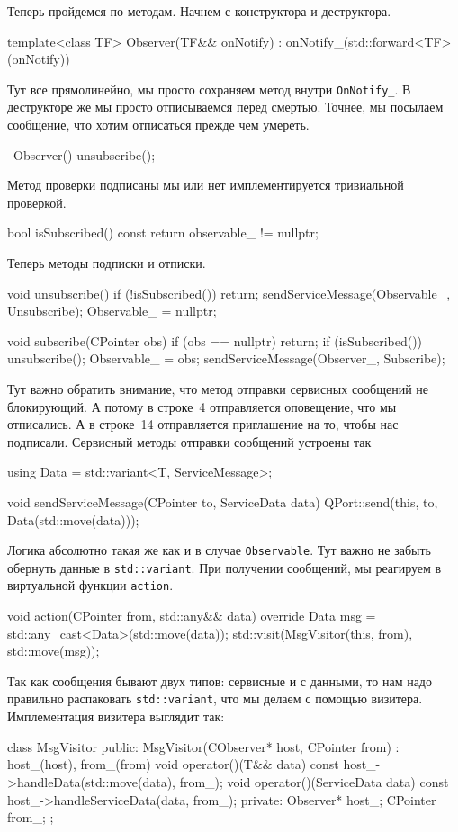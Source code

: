 Теперь пройдемся по методам.
Начнем с конструктора и деструктора.
\begin{cppcode}
template<class TF>
Observer(TF&& onNotify) : onNotify_(std::forward<TF>(onNotify)) {}
\end{cppcode}
Тут все прямолинейно, мы просто сохраняем метод внутри \verb"OnNotify_".
В деструкторе же мы просто отписываемся перед смертью.
Точнее, мы посылаем сообщение, что хотим отписаться прежде чем умереть.
\begin{cppcode}
~Observer() {
  unsubscribe();
}
\end{cppcode}
Метод проверки подписаны мы или нет имплементируется тривиальной проверкой.
\begin{cppcode}
bool isSubscribed() const {
  return observable_ != nullptr;
}
\end{cppcode}
Теперь методы подписки и отписки.
\begin{cppcode}
void unsubscribe() {
  if (!isSubscribed())
    return;
  sendServiceMessage(Observable_, {Unsubscribe});
  Observable_ = nullptr;
}

void subscribe(CPointer obs) {
  if (obs == nullptr)
    return;
  if (isSubscribed())
    unsubscribe();
  Observable_ = obs;
  sendServiceMessage(Observer_, {Subscribe});
}
\end{cppcode}
Тут важно обратить внимание, что метод отправки сервисных сообщений не блокирующий.
А потому в строке~4 отправляется оповещение, что мы отписались.
А в строке~14 отправляется приглашение на то, чтобы нас подписали.
Сервисный методы отправки сообщений устроены так
\begin{cppcode}
using Data = std::variant<T, ServiceMessage>;

void sendServiceMessage(CPointer to, ServiceData data) {
  QPort::send(this, to, Data(std::move(data)));
}
\end{cppcode}
Логика абсолютно такая же как и в случае \verb"Observable".
Тут важно не забыть обернуть данные в \verb"std::variant".
При получении сообщений, мы реагируем в виртуальной функции \verb"action".
\begin{cppcode}
void action(CPointer from, std::any&& data) override {
  Data msg = std::any_cast<Data>(std::move(data));
  std::visit(MsgVisitor(this, from), std::move(msg));
}
\end{cppcode}
Так как сообщения бывают двух типов: сервисные и с данными, то нам надо правильно распаковать \verb"std::variant", что мы делаем с помощью визитера.
Имплементация визитера выглядит так:
\begin{cppcode}
class MsgVisitor {
public:
  MsgVisitor(CObserver* host, CPointer from) : host_(host), from_(from) {
  }
  void operator()(T&& data) const {
    host_->handleData(std::move(data), from_);
  }
  void operator()(ServiceData data) const {
    host_->handleServiceData(data, from_);
  }
private:
  Observer* host_;
  CPointer from_;
};
\end{cppcode}

